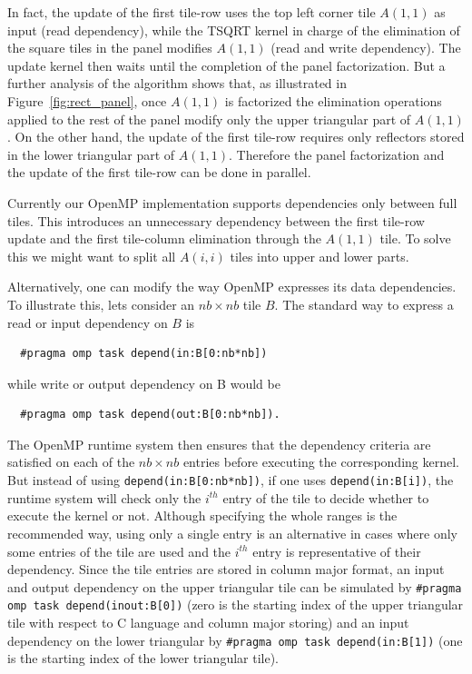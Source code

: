 In fact, the update of the first tile-row uses the top
left corner tile $A(1,1)$ as input (read dependency), while the TSQRT
kernel in charge of the elimination of the square tiles in the panel
modifies $A(1,1)$ (read and write dependency). The update kernel then
waits until the completion of the panel factorization. But a further
analysis of the algorithm shows that, as illustrated in
Figure~\ref{fig:rect_panel}, once $A(1,1)$ is factorized the
elimination operations applied to the rest of the panel modify only
the upper triangular part of $A(1,1)$. On the other hand, the update
of the first tile-row requires only reflectors stored in the lower
triangular part of $A(1,1)$.
Therefore the panel factorization and the update of
the first tile-row can be done in parallel.

Currently our OpenMP implementation supports dependencies only
between full tiles.
This introduces an unnecessary dependency between
the first tile-row update and the first tile-column
elimination through the $A(1,1)$ tile.
To solve this we might want to
split all $A(i,i)$ tiles into upper and lower parts.

Alternatively, one can modify the way OpenMP expresses
its data dependencies.
To illustrate this, lets consider an $nb \times nb$ tile $B$.
The standard way to express a read or input dependency on $B$ is
\begin{lstlisting}
  #pragma omp task depend(in:B[0:nb*nb])
\end{lstlisting}
while write or output dependency on B would be
\begin{lstlisting}
  #pragma omp task depend(out:B[0:nb*nb]).
\end{lstlisting}

The OpenMP runtime system then ensures that the dependency criteria
are satisfied on each of the $nb \times nb$ entries before executing
the corresponding kernel. But instead of using
\texttt{depend(in:B[0:nb*nb])}, if one uses \texttt{depend(in:B[i])},
the runtime system will check only the $i^{th}$ entry of the tile to
decide whether to execute the kernel or not. Although specifying the
whole ranges is the recommended way, using only a single entry is an
alternative in cases where only some entries of the tile are used and
the $i^{th}$ entry is representative of their dependency. Since the
tile entries are stored in column major format, an input and output
dependency on the upper triangular tile can be simulated by
\texttt{\#pragma omp task depend(inout:B[0])} (zero is the starting
index of the upper triangular tile with respect to C language and
column major storing) and an input dependency on the
lower triangular by \texttt{\#pragma omp task depend(in:B[1])} (one is
the starting index of the lower triangular tile).

